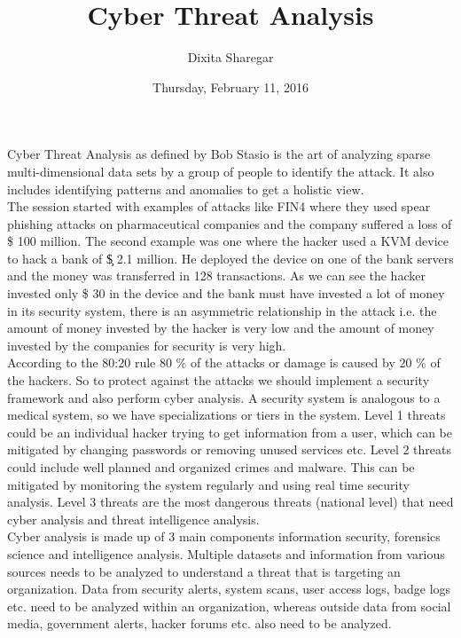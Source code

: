 \documentclass{article}
\title {Cyber Threat Analysis}
\author{Dixita Sharegar}
\date{Thursday, February 11, 2016}
\begin{document}
\maketitle
Cyber Threat Analysis as defined by Bob Stasio is the art of analyzing sparse multi-dimensional data sets by a group of people to identify the attack. It also includes identifying patterns and anomalies to get a holistic view. \\

The session started with examples of attacks like FIN4 where they used spear phishing attacks on pharmaceutical companies and the company suffered a loss of \$ 100 million. The second example was one where the hacker used a KVM device to hack a bank of \c \$ 2.1 million. He deployed the device on one of the bank servers and the money was transferred in 128 transactions. As we can see the hacker invested only \$ 30 in the device and the bank must have invested a lot of money in its security system, there is an asymmetric relationship in the attack i.e. the amount of money invested by the hacker is very low and the amount of money invested by the companies for security is very high.\\

According to the 80:20 rule 80 \% of the attacks or damage is caused by 20 \% of the hackers. So to protect against the attacks we should implement a security framework and also perform cyber analysis. A security system is analogous to a medical system, so we have specializations or tiers in the system. Level 1 threats could be an individual hacker trying to get information from a user, which can be mitigated by changing passwords or removing unused services etc. Level 2 threats could include well planned and organized crimes and malware. This can be mitigated by monitoring the system regularly and using real time security analysis. Level 3 threats are the most dangerous threats (national level) that need cyber analysis and threat intelligence analysis.\\

Cyber analysis is made up of 3 main components information security, forensics science and intelligence analysis. Multiple datasets and information from various sources needs to be analyzed to understand a threat that is targeting an organization. Data from security alerts, system scans, user access logs, badge logs etc. need to be analyzed within an organization, whereas outside data from social media, government alerts, hacker forums etc. also need to be analyzed.\\
\end{document}
